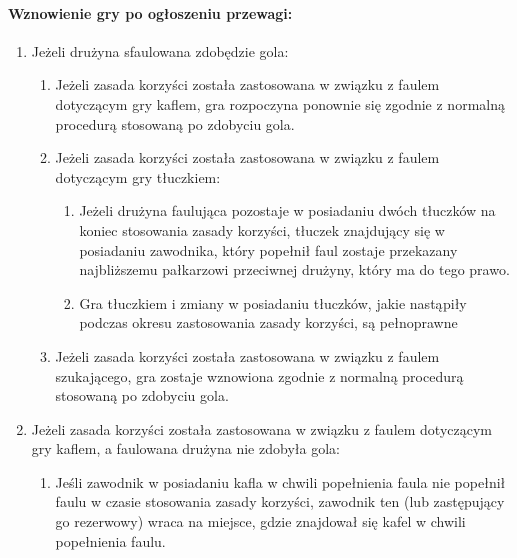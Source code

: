 \documentclass[12pt]{article}
\begin{document}
\paragraph{Wznowienie gry po ogłoszeniu przewagi:}

\begin{enumerate}
	\item
	      Jeżeli drużyna sfaulowana zdobędzie gola:

	      \begin{enumerate}
		      \item
		            Jeżeli zasada korzyści została zastosowana w związku z faulem
		            dotyczącym gry kaflem, gra rozpoczyna ponownie się zgodnie z
		            normalną procedurą stosowaną po zdobyciu gola.
		      \item
		            Jeżeli zasada korzyści została zastosowana w związku z faulem
		            dotyczącym gry tłuczkiem:

		            \begin{enumerate}
			            \item
			                  Jeżeli drużyna faulująca pozostaje w posiadaniu dwóch tłuczków na
			                  koniec stosowania zasady korzyści, tłuczek znajdujący się w
			                  posiadaniu zawodnika, który popełnił faul zostaje przekazany
			                  najbliższemu pałkarzowi przeciwnej drużyny, który ma do tego
			                  prawo.
			            \item
			                  Gra tłuczkiem i zmiany w posiadaniu tłuczków, jakie nastąpiły
			                  podczas okresu zastosowania zasady korzyści, są pełnoprawne
		            \end{enumerate}
		      \item
		            Jeżeli zasada korzyści została zastosowana w związku z faulem
		            szukającego, gra zostaje wznowiona zgodnie z normalną procedurą
		            stosowaną po zdobyciu gola.
	      \end{enumerate}
	\item
	      Jeżeli zasada korzyści została zastosowana w związku z faulem
	      dotyczącym gry kaflem, a faulowana drużyna nie zdobyła gola:

	      \begin{enumerate}
		      \item
		            Jeśli zawodnik w posiadaniu kafla w chwili popełnienia faula nie
		            popełnił faulu w czasie stosowania zasady korzyści, zawodnik ten
		            (lub zastępujący go rezerwowy) wraca na miejsce, gdzie znajdował się
		            kafel w chwili popełnienia faulu.


\end{enumerate}
\end{enumerate}
\end{document}

